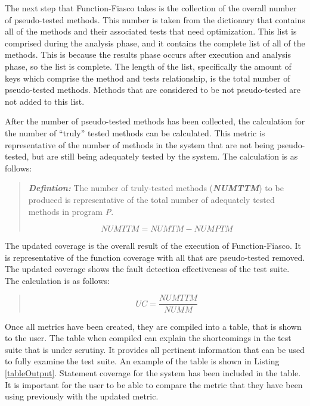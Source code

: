         The next step that Function-Fiasco takes is the collection of the overall number of pseudo-tested methods. This number is taken from the dictionary that contains all of the methods and their associated tests that need optimization. This list is comprised during the analysis phase, and it contains the complete list of all of the methods. This is because the results phase occurs after execution and analysis phase, so the list is complete. The length of the list, specifically the amount of keys which comprise the method and tests relationship, is the total number of pseudo-tested methods. Methods that are considered to be not pseudo-tested are not added to this list.

        After the number of pseudo-tested methods has been collected, the calculation for the number of ``truly'' tested methods can be calculated. This metric is representative of the number of methods in the system that are not being pseudo-tested, but are still being adequately tested by the system. The calculation is as follows:

        \begin{quote}
        \textbf{\textit{Defintion:}} The number of truly-tested methods (\textbf{\textit{NUMTTM}}) to be produced is representative of the total number of adequately tested methods in program \textit{P}.

        \begin{equation}
        NUMTTM = NUMTM - NUMPTM
        \end{equation}
        \end{quote}

        The updated coverage is the overall result of the execution of Function-Fiasco. It is representative of the function coverage with all that are pseudo-tested removed. The updated coverage shows the fault detection effectiveness of the test suite. The calculation is as follows:
        \begin{quote}
        \begin{equation}
        UC = \frac{NUMTTM}{NUMM}
        \end{equation}
        \end{quote}

        Once all metrics have been created, they are compiled into a table, that is shown to the user. The table when compiled can explain the shortcomings in the test suite that is under scrutiny. It provides all pertinent information that can be used to fully examine the test suite. An example of the table is shown in Listing \ref{tableOutput}. Statement coverage for the system has been included in the table. It is important for the user to be able to compare the metric that they have been using previously with the updated metric.

